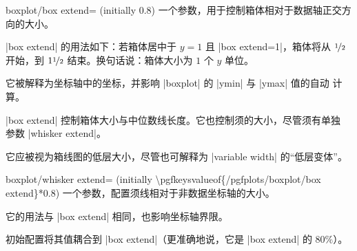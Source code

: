 \begin{pgfplotskey}{boxplot/box extend= (initially 0.8)}
    一个参数，用于控制箱体相对于数据轴正交方向的大小。

    |box extend| 的用法如下：若箱体居中于 $y=1$ 且 |box extend=1|，箱体将从
    $\nicefrac{1}{2}$ 开始，到 $1\nicefrac{1}{2}$ 结束。换句话说：箱体大小为
    $1$ 个 $y$ 单位。

    它被解释为坐标轴中的坐标，并影响 |boxplot| 的 |ymin| 与 |ymax| 值的自动
    计算。
\begin{codeexample}[]
\end{codeexample}

    |box extend| 控制箱体大小与中位数线长度。它也控制须的大小，尽管须有单独
    参数 |whisker extend|。

    它应被视为箱线图的低层大小，尽管也可解释为 |variable width| 的“低层变体”。
\end{pgfplotskey}

\begin{pgfplotskey}{boxplot/whisker extend= (initially \textbackslash pgfkeysvalueof\{/pgfplots/boxplot/box extend\}*0.8)}
    一个参数，配置须线相对于非数据坐标轴的大小。

    它的用法与 |box extend| 相同，也影响坐标轴界限。

    初始配置将其值耦合到 |box extend|（更准确地说，它是 |box extend| 的 $80\%$）。
\end{pgfplotskey}


